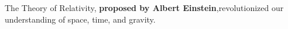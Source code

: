 \documentclass[preview]{standalone}
\begin{document}
\begin{center}
The Theory of Relativity, \textbf{proposed by Albert Einstein},revolutionized our understanding of space, time, and gravity.
\end{center}
\end{document}
